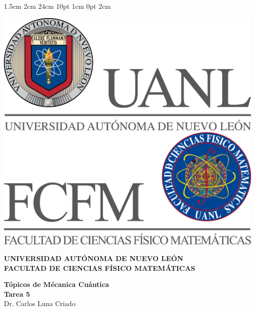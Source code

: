 \documentclass[12pt,letterpaper]{report}
\begin{document}
\setmargins{2.5cm}      
{1.5cm}                     
{2cm}  
{24cm}                    
{10pt}                          
{1cm}                          
{0pt}                             
{2cm}
\begin{titlepage}
\begin{center}
\includegraphics[scale=0.40]{../../Logos/uanl.png} 
\hspace{2.5cm}
\includegraphics[scale=0.40]{../../Logos/fcfm.png}
\end{center}
\vspace{2cm}
\begin{center}
\textbf{
UNIVERSIDAD AUTÓNOMA DE NUEVO LEÓN\\
FACULTAD DE CIENCIAS
    FÍSICO MATEMÁTICAS}\\
\vspace*{2cm}
\begin{large}
\vspace{1cm}
\large{\textbf{Tópicos de Mécanica Cuántica}}\\
\textbf{Tarea 5}\\
Dr. Carlos Luna Criado\\
\end{large}
\vspace{3.5cm}
\begin{minipage}{0.6\linewidth}
\vspace{0.5cm}

\end{minipage}
\end{center}
\end{titlepage}
\end{document}
